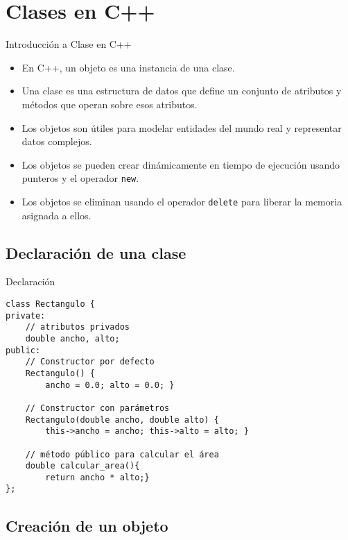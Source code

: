 \documentclass{beamer}
\begin{document}
\section{Clases en C++}

\begin{frame}{Introducción a Clase en C++}
\begin{itemize}
\item En C++, un objeto es una instancia de una clase.
\item Una clase es una estructura de datos que define un conjunto de atributos y métodos que operan sobre esos atributos.
\item Los objetos son útiles para modelar entidades del mundo real y representar datos complejos.
\item Los objetos se pueden crear dinámicamente en tiempo de ejecución usando punteros y el operador \texttt{new}.
\item Los objetos se eliminan usando el operador \texttt{delete} para liberar la memoria asignada a ellos.
\end{itemize}
\end{frame}

%

\subsection{Declaración de una clase}

\begin{frame}[fragile]{Declaración}
\begin{verbatim}
class Rectangulo {
private:
    // atributos privados
    double ancho, alto;
public:
    // Constructor por defecto
    Rectangulo() {
        ancho = 0.0; alto = 0.0; }

    // Constructor con parámetros
    Rectangulo(double ancho, double alto) {
        this->ancho = ancho; this->alto = alto; }

    // método público para calcular el área
    double calcular_area(){
        return ancho * alto;}
};
\end{verbatim}
\end{frame}

\subsection{Creación de un objeto}
\end{document}
